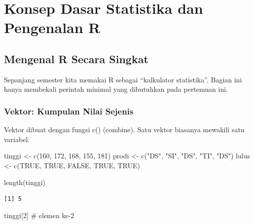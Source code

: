 \documentclass[
  indonesian,
  letterpaper,
]{book}
\newenvironment{Shaded}{\begin{snugshade}}{\end{snugshade}}
\newcommand{\CommentTok}[1]{\textcolor[rgb]{0.37,0.37,0.37}{#1}}
\newcommand{\ConstantTok}[1]{\textcolor[rgb]{0.56,0.35,0.01}{#1}}
\newcommand{\DecValTok}[1]{\textcolor[rgb]{0.68,0.00,0.00}{#1}}
\newcommand{\FunctionTok}[1]{\textcolor[rgb]{0.28,0.35,0.67}{#1}}
\newcommand{\NormalTok}[1]{\textcolor[rgb]{0.00,0.23,0.31}{#1}}
\newcommand{\OtherTok}[1]{\textcolor[rgb]{0.00,0.23,0.31}{#1}}
\newcommand{\StringTok}[1]{\textcolor[rgb]{0.13,0.47,0.30}{#1}}
\begin{document}

\chapter{Konsep Dasar Statistika dan Pengenalan
R}\label{konsep-dasar-statistika-dan-pengenalan-r}

\section{Mengenal R Secara Singkat}\label{mengenal-r-secara-singkat}

Sepanjang semester kita memakai R sebagai ``kalkulator statistika''.
Bagian ini hanya membekali perintah minimal yang dibutuhkan pada
pertemuan ini.

\subsection{Vektor: Kumpulan Nilai
Sejenis}\label{vektor-kumpulan-nilai-sejenis}

Vektor dibuat dengan fungsi c() (combine). Satu vektor biasanya mewakili
satu variabel.

\begin{Shaded}
\begin{Highlighting}[]
\NormalTok{tinggi }\OtherTok{\textless{}{-}} \FunctionTok{c}\NormalTok{(}\DecValTok{160}\NormalTok{, }\DecValTok{172}\NormalTok{, }\DecValTok{168}\NormalTok{, }\DecValTok{155}\NormalTok{, }\DecValTok{181}\NormalTok{)}
\NormalTok{prodi }\OtherTok{\textless{}{-}} \FunctionTok{c}\NormalTok{(}\StringTok{"DS"}\NormalTok{, }\StringTok{"SI"}\NormalTok{, }\StringTok{"DS"}\NormalTok{, }\StringTok{"TI"}\NormalTok{, }\StringTok{"DS"}\NormalTok{)}
\NormalTok{lulus }\OtherTok{\textless{}{-}} \FunctionTok{c}\NormalTok{(}\ConstantTok{TRUE}\NormalTok{, }\ConstantTok{TRUE}\NormalTok{, }\ConstantTok{FALSE}\NormalTok{, }\ConstantTok{TRUE}\NormalTok{, }\ConstantTok{TRUE}\NormalTok{)}

\FunctionTok{length}\NormalTok{(tinggi)}
\end{Highlighting}
\end{Shaded}

\begin{verbatim}
[1] 5
\end{verbatim}

\begin{Shaded}
\begin{Highlighting}[]
\NormalTok{tinggi[}\DecValTok{2}\NormalTok{] }\CommentTok{\# elemen ke{-}2}
\end{Highlighting}
\end{Shaded}
\end{document}
